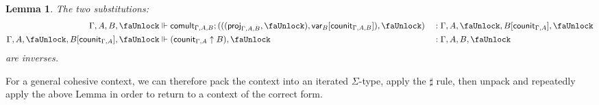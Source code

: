 \documentclass[10pt]{article}
\newtheorem{lemma}{Lemma}
\theoremstyle{definition}
\newcommand{\qyields}{\Vdash}
\newcommand\proj[1]{\ensuremath{\mathsf{proj}_{#1}}}
\newcommand\qvar[1]{\ensuremath{\mathsf{var}_{#1}}}
\newcommand{\lock}{\text{\faUnlock}}
\newcommand{\counit}[1]{\mathsf{counit}_{#1}}
\newcommand{\comult}[1]{\mathsf{comult}_{#1}}
\begin{document}
\begin{lemma}
The two substitutions:
\begin{align*}
\Gamma, A, B, \lock &\qyields \comult{\Gamma, A, B};(((\proj{\Gamma, A, B}, \lock), \qvar{B}[\counit{\Gamma, A, B}]), \lock) &&: \Gamma, A, \lock, B[\counit{\Gamma, A}], \lock \\
\Gamma, A, \lock, B[\counit{\Gamma, A}], \lock &\qyields (\counit{\Gamma, A} \uparrow B), \lock &&: \Gamma, A, B, \lock
\end{align*}
are inverses.
\end{lemma}

For a general cohesive context, we can therefore pack the context into an iterated $\Sigma$-type, apply the $\sharp$ rule, then unpack and repeatedly apply the above Lemma in order to return to a context of the correct form.
\end{document}
